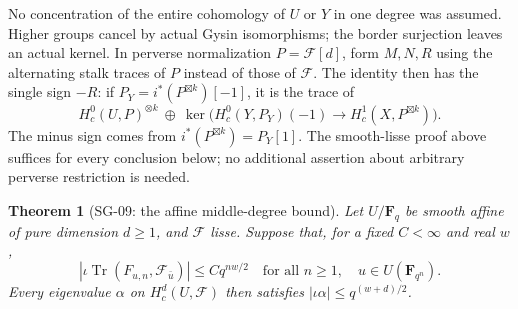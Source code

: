 \documentclass[11pt,a4paper]{article}
\newtheorem{theorem}{Theorem}[section]
\theoremstyle{remark}
\begin{document}
No concentration of the entire cohomology of $U$ or $Y$ in one degree was
assumed.  Higher groups cancel by actual Gysin isomorphisms; the border
surjection leaves an actual kernel.  In perverse normalization
$P=\mathcal F[d]$, form $M,N,R$ using the alternating stalk traces of
$P$ instead of those of $\mathcal F$.  The identity then has the single sign $-R$:
if $P_Y=i^*(P^{\boxtimes k})[-1]$, it is the trace of
\[
 H_c^0(U,P)^{\otimes k}\ \oplus\
 \ker\bigl(H_c^0(Y,P_Y)(-1)\longrightarrow
                         H_c^1(X,P^{\boxtimes k})\bigr).
\]
The minus sign comes from $i^*(P^{\boxtimes k})=P_Y[1]$.
The smooth-lisse proof above suffices for every conclusion below; no
additional assertion about arbitrary perverse restriction is needed.

\begin{theorem}[SG-09: the affine middle-degree bound]
\label{thm:affine}
Let $U/\mathbf F_q$ be smooth affine of pure dimension $d\ge1$, and
$\mathcal F$ lisse.  Suppose that, for a fixed $C<\infty$ and real $w$,
\[
 |\iota\operatorname{Tr}(F_{u,n},\mathcal F_{\bar u})|
       \le Cq^{nw/2}
 \quad\text{for all }n\ge1,\quad u\in U(\mathbf F_{q^n}).
\]
Every eigenvalue $\alpha$ on $H_c^d(U,\mathcal F)$ then satisfies
$|\iota\alpha|\le q^{(w+d)/2}$.
\end{theorem}
\end{document}

